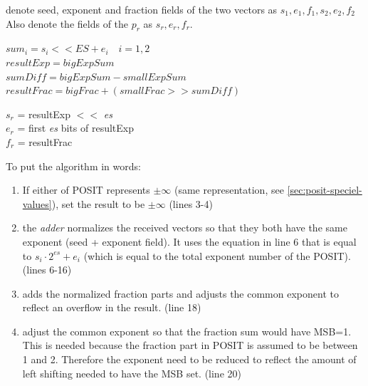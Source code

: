 \documentclass[10pt]{article}
\begin{document}
\begin{algorithm}[H]
 denote seed, exponent and fraction fields of the two vectors as
 $s_{1}, e_{1}, f_{1}, s_{2}, e_{2}, f_{2}$ \\
 Also denote the fields of the $p_{r}$ as $s_{r}, e_{r}, f_{r}$. \\

  {
   $sum_{i}= s_{i} << ES + e_{i} \quad i=1,2$ \\
   $resultExp = bigExpSum$ \\
   $sumDiff = bigExpSum - smallExpSum$ \\
   $resultFrac = bigFrac + (smallFrac >> sumDiff)$ \\

   $s_{r}$ = resultExp $<<$ \textit{es} \\
   $e_{r}$ = first \textit{es} bits of resultExp \\
   $f_{r}$ = resultFrac
    }
  \end{algorithm}

  \vspace{0.3cm}
\noindent To put the algorithm in words:
\begin{enumerate}

  \item If either of POSIT represents $\pm \infty$ (same representation, see
  \autoref{sec:posit-speciel-values}), set the result to be $\pm \infty$ (lines 3-4)
  \item the \textit{adder} normalizes the received vectors so that they both
    have the same exponent (seed + exponent field). It uses the equation in line 6 that is equal to
    $ s_{i} \cdot 2^{es} + e_{i}$ (which is equal to
    the total exponent number of the POSIT). (lines 6-16)

  \item adds the normalized fraction parts and adjusts the common exponent to
  reflect an overflow in the result. (line 18)
  \item adjust the common exponent so that the fraction sum would have MSB=1.
  This is needed because the fraction part in POSIT is assumed to be between 1
  and 2. Therefore the exponent need to be reduced to reflect the amount of left
  shifting needed to have the MSB set. (line 20)
  
  \end{enumerate}
\end{document}
